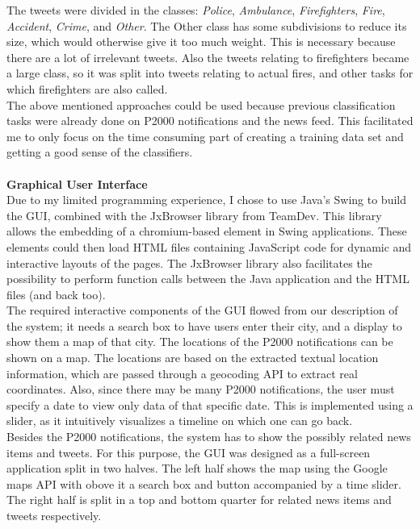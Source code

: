 The tweets were divided in the classes: \emph{Police}, \emph{Ambulance}, \emph{Firefighters}, \emph{Fire}, \emph{Accident}, \emph{Crime},  and \emph{Other}. The Other class has some subdivisions to reduce its size, which would otherwise give it too much weight. This is necessary because there are a lot of irrelevant tweets. Also the tweets relating to firefighters became a large class, so it was split into tweets relating to actual fires, and other tasks for which firefighters are also called.\\

The above mentioned approaches could be used because previous classification tasks were already done on P2000 notifications and the news feed. This facilitated me to only focus on the time consuming part of creating a training data set and getting a good sense of the classifiers.\\
\\
\textbf{Graphical User Interface}\\
Due to my limited programming experience, I chose to use Java's Swing to build the GUI, combined with the JxBrowser library from TeamDev. This library allows the embedding of a chromium-based element in Swing applications. These elements could then load HTML files containing JavaScript code for dynamic and interactive layouts of the pages. The JxBrowser library also facilitates the possibility to perform function calls between the Java application and the HTML files (and back too).\\ 

The required interactive components of the GUI flowed from our description of the system; it needs a search box to have users enter their city, and a display to show them a map of that city. 
The locations of the P2000 notifications can be shown on a map. The locations are based on the extracted textual location information, which are passed through a geocoding API to extract real coordinates. 
Also, since there may be many P2000 notifications, the user must specify a date to view only data of that specific date. This is implemented using a slider, as it intuitively visualizes a timeline on which one can go back. \\
Besides the P2000 notifications, the system has to show the possibly related news items and tweets. For this purpose, the GUI was designed as a full-screen 
application split in two halves. The left half shows the map using the Google maps API with obove it a search box and button accompanied by a time slider. The right half is split in a top and bottom quarter for related news items and tweets respectively. \\

